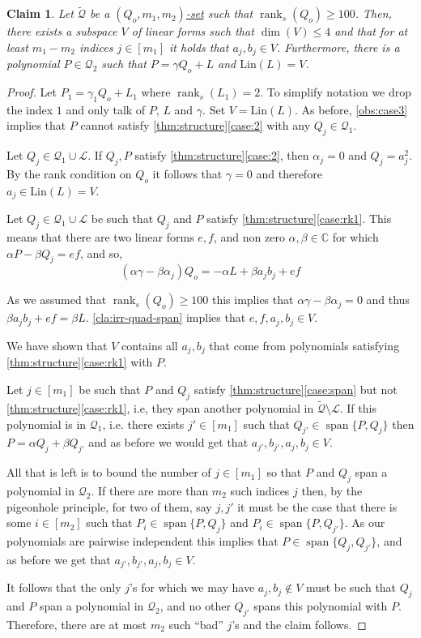 \documentclass[10pt,a4paper]{article}
\newtheorem{claim}[theorem]{Claim}
\def\rank{\operatorname{rank}}
\renewcommand{\C}{\mathbb{C}}
\newcommand{\calL}{{\mathcal{L}}}
\newcommand{\cQ}{{\mathcal{Q}}}
\newcommand{\spn}[1]{\operatorname{span}\{{#1}\}}
\newcommand{\rkq}{100}
\newcommand{\MS}{\text{Lin}}
\begin{document}
\begin{claim}\label{cla:small-space-span}
Let $\tilde{\cQ}$ be a \hyperref[def:Q-dom]{$(Q_o,m_1,m_2)$-set} such that $\rank_s(Q_o)\geq \rkq$. 
Then, there exists a subspace $V$ of linear  forms such that $\dim(V) \leq 4$ and that for at least $m_1-m_2 $ indices $j\in [m_1]$ it holds that $a_j,b_j \in V $. Furthermore, there is a polynomial $P\in\cQ_2$ such that $P = \gamma Q_o + L$ and $\MS(L) = V$.
\end{claim}
\begin{proof}
Let $P_1 = \gamma_1Q_o+L_1$ where $\rank_s(L_1) =2$. To simplify notation we drop the index $1$ and only talk of $P$, $L$ and $\gamma$. Set $V = \MS(L)$.
As before, \autoref{obs:case3} implies that $P$ cannot satisfy \autoref{thm:structure}\ref{case:2} with any $Q_j\in \cQ_1$.

Let $Q_j\in\cQ_1\cup\calL$. If $Q_j, P$ satisfy \autoref{thm:structure}\ref{case:2}, then $\alpha_j = 0$ and $Q_j  =a_j^2$. By the rank condition on $Q_o$ it follows that $\gamma = 0$  and therefore $a_j \in \MS(L) = V$.

Let $Q_j\in \cQ_1\cup\calL$ be such that $Q_j$ and $P$ satisfy \autoref{thm:structure}\ref{case:rk1}. This means that there are two linear forms $e,f$, and non zero $\alpha, \beta \in \C$ for which $\alpha P - \beta Q_j = ef$, and so,
\begin{equation}
(\alpha \gamma -\beta\alpha_j)Q_o = -\alpha L + \beta a_jb_j +ef
\end{equation}

As we assumed that $\rank_s(Q_o) \geq \rkq$ this implies that $\alpha \gamma-\beta\alpha_j = 0$ and thus $\beta a_jb_j + ef = \beta L$.  \autoref{cla:irr-quad-span} implies that $e, f, a_{j}, b_{j} \in V$. 

We have shown that $V$ contains all $a_j,b_j$ that come from polynomials satisfying  \autoref{thm:structure}\ref{case:rk1} with $P$.


Let $j\in[m_1]$ be such that $P$ and $Q_j$ satisfy \autoref{thm:structure}\ref{case:span} but not \autoref{thm:structure}\ref{case:rk1}, i.e, they span another polynomial in $\tilde{\cQ}\setminus\calL$. If this polynomial is in $\cQ_1$, i.e. there exists $j' \in [m_1]$ such that $Q_{j'}\in \spn{P,Q_j}$ then $P = \alpha Q_j + \beta Q_{j'}$ and as before we would get that $a_{j'} ,b_{j'}, a_{j}, b_{j} \in V$.

All that is left is to bound the number of $j\in[m_1]$ so that $P$ and $Q_j$ span a polynomial in $\cQ_2$. If there are more than $m_2$ such indices $j$ then, by the pigeonhole principle, for two of them, say $j,j'$ it must be the case that there is some $i \in [m_2]$ such that $P_{i}\in \spn{P,Q_j}$ and $P_{i}\in \spn{P,Q_{j'}}$. As our polynomials are pairwise independent this implies that $P \in \spn{Q_j,Q_{j'}}$, and as before we get that $a_{j'},b_{j'}, a_{j},b_{j}\in V$. 

It follows that the only $j$'s for which we may have $a_j,b_j\not\in V$ must be such that $Q_j$ and $P$ span a polynomial in $\cQ_2$, and no other $Q_{j'}$ spans this polynomial with $P$. Therefore, there are at most $m_2$ such ``bad'' $j$'s and the claim follows. 
\end{proof}
\end{document}
